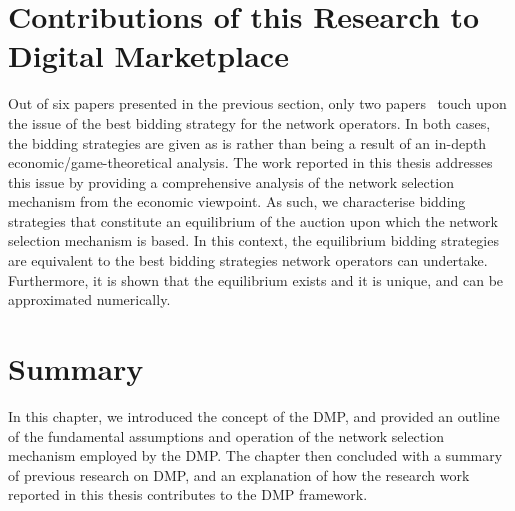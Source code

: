 \section{Contributions of this Research to Digital Marketplace} %
\label{sec:contributions_of_this_research_to_digital_marketplace_dmp}
Out of six papers presented in the previous section, only two papers~\cite{DMLeBodic00,DMIrvine01} touch upon the issue of the best bidding strategy for the network operators. In both cases, the bidding strategies are given as is rather than being a result of an in-depth economic/game-theoretical analysis. The work reported in this thesis addresses this issue by providing a comprehensive analysis of the network selection mechanism from the economic viewpoint. As such, we characterise bidding strategies that constitute an equilibrium of the auction upon which the network selection mechanism is based. In this context, the equilibrium bidding strategies are equivalent to the best bidding strategies network operators can undertake. Furthermore, it is shown that the equilibrium exists and it is unique, and can be approximated numerically.

\section{Summary} %
\label{sec:summary_dmp}
In this chapter, we introduced the concept of the DMP, and provided an outline of the fundamental assumptions and operation of the network selection mechanism employed by the DMP. The chapter then concluded with a summary of previous research on DMP, and an explanation of how the research work reported in this thesis contributes to the DMP framework.
